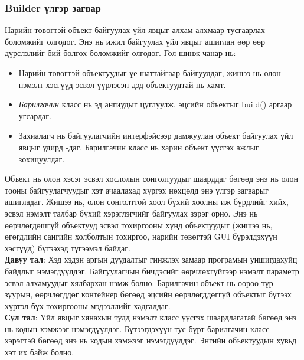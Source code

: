 \subsubsection{Builder үлгэр загвар}
\quad \quad Нарийн төвөгтэй объект байгуулах үйл явцыг алхам алхмаар тусгаарлах боломжийг олгодог. Энэ нь ижил байгуулах үйл явцыг ашиглан өөр өөр дүрслэлийг бий болгох боломжийг олгодог. Гол шинж чанар нь:
\begin{itemize}
	\item Нарийн төвөгтэй объектуудыг үе шаттайгаар байгуулдаг, жишээ нь олон нэмэлт хэсгүүд эсвэл үүрлэсэн дэд объектуудтай нь хамт.
	\item \textit{Барилгачин} класс нь эд ангиудыг цуглуулж, эцсийн объектыг build() аргаар угсардаг.
	\item Захиалагч нь байгуулагчийн интерфэйсээр дамжуулан объект байгуулах үйл явцыг удирд -даг. Барилгачин класс нь харин объект үүсгэх ажлыг зохицуулдаг.
\end{itemize}
Объект нь олон хэсэг эсвэл хослолын сонголтуудыг шаарддаг бөгөөд энэ нь олон тооны байгуулагчуудыг хэт ачаалахад хүргэх нөхцөлд энэ үлгэр загварыг ашигладаг. Жишээ нь, олон сонголттой хоол бүхий хоолны иж бүрдлийг хийх, эсвэл нэмэлт талбар бүхий хэрэглэгчийг байгуулах зэрэг орно. Энэ нь өөрчлөгдөшгүй объектууд эсвэл тохиргооны хүнд объектуудыг (жишээ нь, өгөгдлийн сангийн холболтын тохиргоо, нарийн төвөгтэй GUI бүрэлдэхүүн хэсгүүд) бүтээхэд түгээмэл байдаг.\\
\textbf{Давуу тал}: Хэд хэдэн аргын дуудалтыг гинжлэх замаар програмын уншигдахуйц байдлыг нэмэгдүүлдэг. Байгуулагчын бичдэсийг өөрчлөхгүйгээр нэмэлт параметр эсвэл алхамуудыг хялбархан нэмж болно. Барилгачин объект нь өөрөө түр зуурын, өөрчлөгддөг контейнер бөгөөд эцсийн өөрчлөгддөггүй объектыг бүтээх хүртэл бүх тохиргооны мэдээллийг хадгалдаг.\\
\textbf{Сул тал}: Үйл явцыг хянахын тулд нэмэлт класс үүсгэх шаардлагатай бөгөөд энэ нь кодын хэмжээг нэмэгдүүлдэг.	Бүтээгдэхүүн тус бүрт барилгачин класс хэрэгтэй бөгөөд энэ нь кодын хэмжээг нэмэгдүүлдэг. Энгийн объектуудын хувьд хэт их байж болно.

